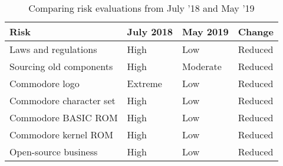 \begin{table}[h!]
  \begin{center}
    \caption{Comparing risk evaluations from July '18 and May '19}
    \label{tab:table1}
    \begin{tabular}{l|l|l|l} %
    	\textbf{Risk} 	&	\textbf{July 2018} & \textbf{May 2019} & \textbf{Change}\\
      \hline
     Laws and regulations 				& High		& Low 		& Reduced\\
     Sourcing old components			& High		& Moderate	& Reduced \\
     Commodore logo						& Extreme	& Low  		& Reduced\\
     Commodore character set			& High		& Low  		& Reduced\\
     Commodore BASIC ROM				& High		& Low 		& Reduced \\
     Commodore kernel ROM				& High		& Low  		& Reduced\\
     Open-source business				& High		& Low  		& Reduced\\
    \end{tabular}
  \end{center}
\end{table}
